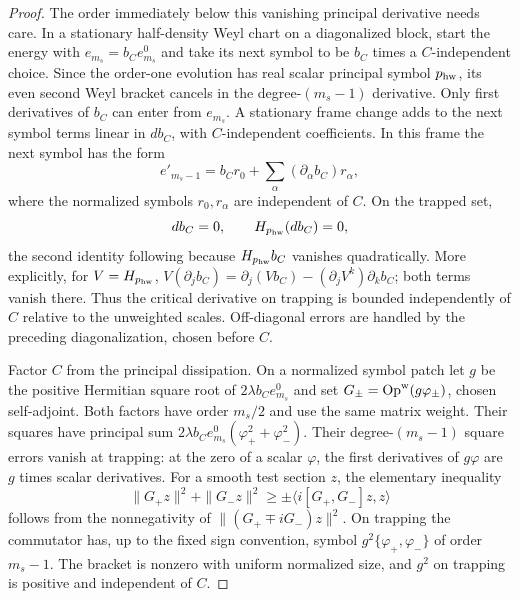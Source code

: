 \begin{proof}
The order immediately below this vanishing principal derivative needs care.
In a stationary half-density Weyl chart on a diagonalized block, start the
energy with $e_{m_s}=b_C e^0_{m_s}$ and take its next symbol to be $b_C$
times a $C$-independent choice.  Since the order-one evolution has real scalar
principal symbol $p_{\rm hw}$, its even second Weyl bracket cancels in the
degree-$(m_s-1)$ derivative.  Only first derivatives of $b_C$ can enter from
$e_{m_s}$.  A stationary frame change adds to the next symbol terms linear
in $db_C$, with $C$-independent coefficients.  In this frame the next
symbol has the form
\begin{equation}\label{co2:frame-subprincipal}
 e'_{m_s-1}=b_C r_0+\sum_\alpha(\partial_\alpha b_C)r_\alpha,
\end{equation}
where the normalized symbols $r_0,r_\alpha$ are independent of $C$.
On the trapped set,
\[
 db_C=0,\qquad H_{p_{\rm hw}}(db_C)=0,
\]
the second identity following because $H_{p_{\rm hw}}b_C$ vanishes
quadratically.  More explicitly, for $V=H_{p_{\rm hw}}$,
$V(\partial_jb_C)=\partial_j(Vb_C)-(\partial_jV^k)\partial_kb_C$;
both terms vanish there.  Thus the critical derivative on trapping is bounded
independently of $C$ relative to the unweighted scales.  Off-diagonal errors
are handled by the preceding diagonalization, chosen before $C$.

Factor $C$ from the principal dissipation.  On a normalized symbol patch
let $g$ be the positive Hermitian square root of
$2\lambda b_Ce^0_{m_s}$ and set
$G_\pm=\operatorname{Op}^{\rm w}(g\varphi_\pm)$, chosen self-adjoint.
Both factors have order $m_s/2$ and use the same matrix weight.  Their
squares have principal sum
$2\lambda b_Ce^0_{m_s}(\varphi_+^2+\varphi_-^2)$.
Their degree-$(m_s-1)$ square errors vanish at trapping: at the zero of a
scalar $\varphi$, the first derivatives of $g\varphi$ are $g$ times
scalar derivatives.  For a smooth test section $z$, the elementary inequality
\begin{equation}\label{co2:trap-uncertainty}
 \|G_+z\|^2+\|G_-z\|^2
 \ge \pm\langle i[G_+,G_-]z,z\rangle
\end{equation}
follows from the nonnegativity of
$\|(G_+\mp iG_-)z\|^2$.  On trapping the commutator has, up to the
fixed sign convention, symbol $g^2\{\varphi_+,\varphi_-\}$ of order
$m_s-1$.  The bracket is nonzero with uniform normalized size, and $g^2$
on trapping is positive and independent of $C$.


\end{proof}
